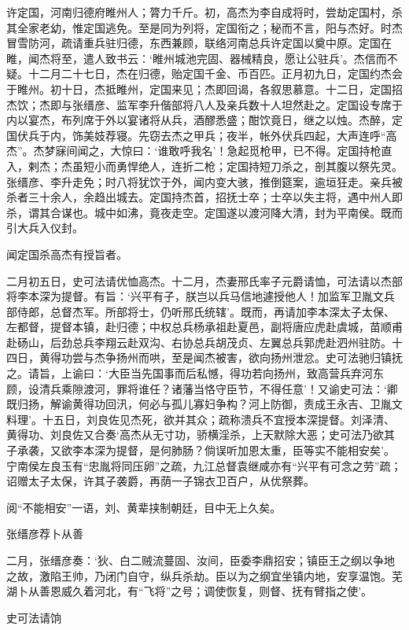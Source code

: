 \documentclass[]{article}
\begin{document}
许定国，河南归德府睢州人；膂力千斤。初，高杰为李自成将时，尝劫定国村，杀其全家老幼，惟定国逃免。至是同为列将，定国衔之；秘而不言，阳与杰好。时杰冒雪防河，疏请重兵驻归德，东西兼顾，联络河南总兵许定国以奠中原。定国在睢，闻杰将至，遣人致书云：`睢州城池完固、器械精良，愿让公驻兵'。杰信而不疑。十二月二十七日，杰在归德，贻定国千金、币百匹。正月初九日，定国约杰会于睢州。初十日，杰抵睢州，定国来见；杰即回谒，各叙思慕意。十二日，定国招杰饮；杰即与张缙彦、监军李升偕部将八人及亲兵数十人坦然赴之。定国设专席于内以宴杰，布列席于外以宴诸将从兵，酒醪悉盛；酣饮竟日，继之以烛。杰醉，定国伏兵于内，饰美妓荐寝。先窃去杰之甲兵；夜半，帐外伏兵四起，大声连呼``高杰''。杰梦寐间闻之，大惊曰：`谁敢呼我名'！急起觅枪甲，已不得。定国持枪直入，剌杰；杰虽短小而勇悍绝人，连折二枪；定国持短刀杀之，剖其腹以祭先灵。张缙彦、李升走免；时八将犹饮于外，闻内变大骇，推倒筵案，逾垣狂走。亲兵被杀者三十余人，余趋出城去。定国持杰首，招抚士卒；士卒以失主将，遇中州人即杀，谓其合谋也。城中如沸，竟夜走空。定国遂以渡河降大清，封为平南侯。既而引大兵入仪封。

闻定国杀高杰有授旨者。

二月初五日，史可法请优恤高杰。十二月，杰妻邢氏率子元爵请恤，可法请以杰部将李本深为提督。有旨：`兴平有子，朕岂以兵马信地遽授他人！加监军卫胤文兵部侍郎，总督杰军。所部将士，仍听邢氏统辖'。既而，再请加李本深太子太保、左都督，提督本镇，赴归德；中权总兵杨承祖赴夏邑，副将唐应虎赴虞城，苗顺甫赴砀山，后劲总兵李翔云赴双沟、右协总兵胡茂贞、左翼总兵郭虎赴泗州驻防。十四日，黄得功尝与杰争扬州而哄，至是闻杰被害，欲向扬州泄忿。史可法驰归镇抚之。请旨，上谕曰：`大臣当先国事而后私憾，得功若向扬州，致高营兵弃河东顾，设清兵乘隙渡河，罪将谁任？诸藩当恪守臣节，不得任意'！又谕史可法：`卿既归扬，解谕黄得功回汛，何必与孤儿寡妇争构？河上防御，责成王永吉、卫胤文料理'。十五日，刘良佐见杰死，欲并其众；疏称溃兵不宜授本深提督。刘泽清、黄得功、刘良佐又合奏`高杰从无寸功，骄横淫杀，上天默除大恶；史可法乃欲其子承袭，又欲李本深为提督，是何肺肠？倘误听加恩太重，臣等实不能相安矣'。宁南侯左良玉有``忠胤将同压卵''之疏，九江总督袁继咸亦有``兴平有可念之劳''疏；诏赠太子太保，许其子袭爵，再荫一子锦衣卫百户，从优祭葬。

阅``不能相安''一语，刘、黄辈挟制朝廷，目中无上久矣。

张缙彦荐卜从善

二月，张缙彦奏：`狄、白二贼流蔓固、汝间，臣委李鼎招安；镇臣王之纲以争地之故，激陷王帅，乃闭门自守，纵兵杀劫。臣以为之纲宜坐镇内地，安享温饱。芜湖卜从善恩威久着河北，有``飞将''之号；调使恢复，则督、抚有臂指之使'。

史可法请饷
\end{document}
